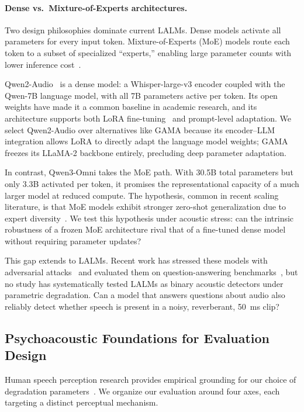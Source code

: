 \documentclass[11pt,a4paper]{article}
\begin{document}
\paragraph{Dense vs.\ Mixture-of-Experts architectures.}
Two design philosophies dominate current LALMs. Dense models activate all parameters for every input token. Mixture-of-Experts (MoE) models route each token to a subset of specialized ``experts,'' enabling large parameter counts with lower inference cost~\cite{shazeer2017outrageously}.

Qwen2-Audio~\cite{chu2024qwen2} is a dense model: a Whisper-large-v3 encoder coupled with the Qwen-7B language model, with all 7B parameters active per token. Its open weights have made it a common baseline in academic research, and its architecture supports both LoRA fine-tuning~\cite{bn2025finetuning} and prompt-level adaptation. We select Qwen2-Audio over alternatives like GAMA because its encoder--LLM integration allows LoRA to directly adapt the language model weights; GAMA freezes its LLaMA-2 backbone entirely, precluding deep parameter adaptation.

In contrast, Qwen3-Omni takes the MoE path. With 30.5B total parameters but only 3.3B activated per token, it promises the representational capacity of a much larger model at reduced compute. The hypothesis, common in recent scaling literature, is that MoE models exhibit stronger zero-shot generalization due to expert diversity~\cite{hu2024large}. We test this hypothesis under acoustic stress: can the intrinsic robustness of a frozen MoE architecture rival that of a fine-tuned dense model without requiring parameter updates?

This gap extends to LALMs. Recent work has stressed these models with adversarial attacks~\cite{hou2025evaluating} and evaluated them on question-answering benchmarks~\cite{yang2025multi,li2025sseu}, but no study has systematically tested LALMs as binary acoustic detectors under parametric degradation. Can a model that answers questions about audio also reliably detect whether speech is present in a noisy, reverberant, 50~ms clip?

\subsection{Psychoacoustic Foundations for Evaluation Design}
\label{subsec:psychoacoustic}

Human speech perception research provides empirical grounding for our choice of degradation parameters~\cite{macpherson2014variations,kocinski2016time,cueille2022effects,studebaker1987articulation}. We organize our evaluation around four axes, each targeting a distinct perceptual mechanism.
\end{document}
